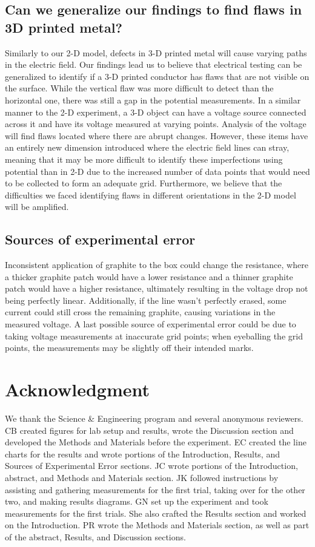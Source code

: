 \documentclass[10pt,journal,twoside]{IEEEtran} %
\begin{document}
\subsection{Can we generalize our findings to find flaws in 3D printed metal?}
        Similarly to our 2-D model, defects in 3-D printed metal will cause varying paths in the electric field. Our findings lead us to believe that electrical testing can be generalized to identify if a 3-D printed conductor has flaws that are not visible on the surface. While the vertical flaw was more difficult to detect than the horizontal one, there was still a gap in the potential measurements. In a similar manner to the 2-D experiment, a 3-D object can have a voltage source connected across it and have its voltage measured at varying points. Analysis of the voltage will find flaws located where there are abrupt changes. However, these items have an entirely new dimension introduced where the electric field lines can stray, meaning that it may be more difficult to identify these imperfections using potential than in 2-D due to the increased number of data points that would need to be collected to form an adequate grid. Furthermore, we believe that the difficulties we faced identifying flaws in different orientations in the 2-D model will be amplified. 

\subsection{Sources of experimental error}
        Inconsistent application of graphite to the box could change the resistance, where a thicker graphite patch would have a lower resistance and a thinner graphite patch would have a higher resistance, ultimately resulting in the voltage drop not being perfectly linear. Additionally, if the line wasn’t perfectly erased, some current could still cross the remaining graphite, causing variations in the measured voltage. A last possible source of experimental error could be due to taking voltage measurements at inaccurate grid points; when eyeballing the grid points, the measurements may be slightly off their intended marks.

\section*{Acknowledgment}
We thank the Science \& Engineering program and several anonymous reviewers. CB created figures for lab setup and results, wrote the Discussion section and developed the Methods and Materials before the experiment. EC created the line charts for the results and wrote portions of the Introduction, Results, and Sources of Experimental Error sections. JC wrote portions of the Introduction, abstract, and Methods and Materials section. JK followed instructions by assisting and gathering measurements for the first trial, taking over for the other two, and making results diagrams. GN set up the experiment and took measurements for the first trials. She also crafted the Results section and worked on the Introduction. PR wrote the Methods and Materials section, as well as part of the abstract, Results, and Discussion sections.
\end{document}

